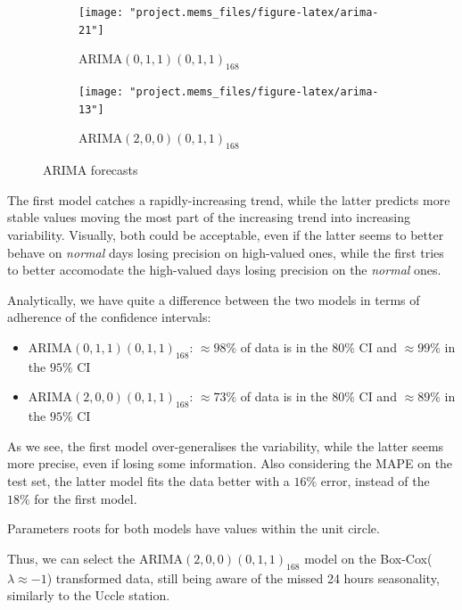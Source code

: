\documentclass[12pt]{article}
\begin{document}
\begin{figure}[h]
	\begin{subfigure}{.5\linewidth}
		\texttt{[image: "project.mems\_files/figure-latex/arima-21"]}
		\caption{$\mathrm{ARIMA}(0,1,1)(0,1,1)_{168}$}
		\label{fig:mems:arima:011011}
	\end{subfigure}
	\begin{subfigure}{.5\linewidth}
		\texttt{[image: "project.mems\_files/figure-latex/arima-13"]}
		\caption{$\mathrm{ARIMA}(2,0,0)(0,1,1)_{168}$}
		\label{fig:mems:arima:200011}
	\end{subfigure}
	\begin{center}
		\caption{ARIMA forecasts}
		\label{fig:mems:arima}
	\end{center}
\end{figure}

The first model catches a rapidly-increasing trend, while the latter predicts more stable values moving the most part of the increasing trend into increasing variability. Visually, both could be acceptable, even if the latter seems to better behave on \textit{normal} days losing precision on high-valued ones, while the first tries to better accomodate the high-valued days losing precision on the \textit{normal} ones.

Analytically, we have quite a difference between the two models in terms of adherence of the confidence intervals:
\begin{itemize}[topsep=0.5em,itemsep=0em,partopsep=0.5em]
	\item $\mathrm{ARIMA}(0,1,1)(0,1,1)_{168}$: $\approx98\%$ of data is in the $80\%$ CI and $\approx99\%$ in the $95\%$ CI
	\item $\mathrm{ARIMA}(2,0,0)(0,1,1)_{168}$: $\approx73\%$ of data is in the $80\%$ CI and $\approx89\%$ in the $95\%$ CI
\end{itemize}
As we see, the first model over-generalises the variability, while the latter seems more precise, even if losing some information. Also considering the MAPE on the test set, the latter model fits the data better with a $16\%$ error, instead of the $18\%$ for the first model.

Parameters roots for both models have values within the unit circle.

Thus, we can select the $\mathrm{ARIMA}(2,0,0)(0,1,1)_{168}$ model on the Box-Cox($\lambda\approx-1$) transformed data, still being aware of the missed 24 hours seasonality, similarly to the Uccle station.

\end{document}

